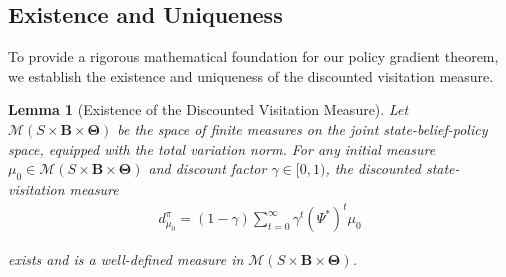 \documentclass[a4paper,12pt]{report}
\newtheorem{lemma}{Lemma}
\begin{document}
\subsection{Existence and Uniqueness}
To provide a rigorous mathematical foundation for our policy gradient theorem,
we establish the existence and uniqueness of the discounted visitation measure.
\begin{lemma}[Existence of the Discounted Visitation Measure]
    Let $\mathcal{M}(S \times \boldsymbol{B}\times \boldsymbol{\Theta})$ be the space
    of finite measures on the joint state-belief-policy space, equipped with the
    total variation norm. For any initial measure $\mu_{0} \in \mathcal{M}(S \times
        \boldsymbol{B}\times \boldsymbol{\Theta})$ and discount factor $\gamma \in [0,1
        )$, the discounted state-visitation measure
    \begin{align}
        d^{\pi}_{\mu_0}= (1-\gamma) \sum_{t=0}^{\infty}\gamma^{t} (\Psi^{*})^{t} \mu_{0}
    \end{align}

    exists and is a well-defined measure in $\mathcal{M}(S \times \boldsymbol{B}\times
        \boldsymbol{\Theta})$.
\end{lemma}
\end{document}
